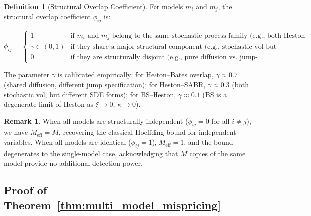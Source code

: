 \documentclass[11pt,a4paper]{article}
\theoremstyle{plain}
\theoremstyle{definition}
\newtheorem{definition}[theorem]{Definition}
\newtheorem{remark}[theorem]{Remark}
\theoremstyle{remark}
\begin{document}
\begin{definition}[Structural Overlap Coefficient]\label{def:phi}
For models $m_i$ and $m_j$, the structural overlap coefficient $\phi_{ij}$ is:

\begin{equation}\label{eq:phi_def}
  \phi_{ij} = \begin{cases}
    1 & \text{if $m_i$ and $m_j$ belong to the same stochastic process family (e.g., both Heston-type),}\\[4pt]
    \gamma \in (0,1) & \text{if they share a major structural component (e.g., stochastic vol but different drivers),}\\[4pt]
    0 & \text{if they are structurally disjoint (e.g., pure diffusion vs.\ jump-diffusion with independent jump structures).}
  \end{cases}
\end{equation}

The parameter $\gamma$ is calibrated empirically: for Heston--Bates overlap, $\gamma \approx 0.7$ (shared diffusion, different jump specification); for Heston--SABR, $\gamma \approx 0.3$ (both stochastic vol, but different SDE forms); for BS--Heston, $\gamma \approx 0.1$ (BS is a degenerate limit of Heston as $\xi \to 0$, $\kappa \to 0$).
\end{definition}

\begin{remark}
When all models are structurally independent ($\phi_{ij} = 0$ for all $i \neq j$), we have $M_{\text{eff}} = M$, recovering the classical Hoeffding bound for independent variables. When all models are identical ($\phi_{ij} = 1$), $M_{\text{eff}} = 1$, and the bound degenerates to the single-model case, acknowledging that $M$ copies of the same model provide no additional detection power.
\end{remark}

\subsection{Proof of Theorem~\ref{thm:multi_model_mispricing}}
\end{document}
